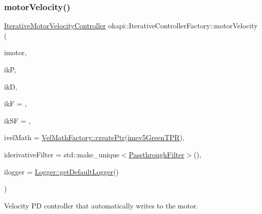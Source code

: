 \subsubsection{\texorpdfstring{motorVelocity()}{motorVelocity()}\hspace{0.1cm}{\footnotesize\ttfamily [2/4]}}
{\footnotesize\ttfamily \mbox{\hyperlink{classokapi_1_1IterativeMotorVelocityController}{Iterative\+Motor\+Velocity\+Controller}} okapi\+::\+Iterative\+Controller\+Factory\+::motor\+Velocity (\begin{DoxyParamCaption}\item[{\mbox{\hyperlink{classokapi_1_1MotorGroup}{Motor\+Group}}}]{imotor,  }\item[{double}]{ikP,  }\item[{double}]{ikD,  }\item[{double}]{ikF = {},  }\item[{double}]{ik\+SF = {},  }\item[{std\+::unique\+\_\+ptr$<$ \mbox{\hyperlink{classokapi_1_1VelMath}{Vel\+Math}} $>$}]{ivel\+Math = {\ttfamily \mbox{\hyperlink{classokapi_1_1VelMathFactory_a26b75e227e114812131c64d17015948f}{Vel\+Math\+Factory\+::create\+Ptr}}(\mbox{\hyperlink{namespaceokapi_a5263bab3bfecd482a573b6d04fb584ac}{imev5\+Green\+T\+PR}})},  }\item[{std\+::unique\+\_\+ptr$<$ \mbox{\hyperlink{classokapi_1_1Filter}{Filter}} $>$}]{iderivative\+Filter = {\ttfamily std\+:\+:make\+\_\+unique$<$\mbox{\hyperlink{classokapi_1_1PassthroughFilter}{Passthrough\+Filter}}$>$()},  }\item[{const std\+::shared\+\_\+ptr$<$ \mbox{\hyperlink{classokapi_1_1Logger}{Logger}} $>$ \&}]{ilogger = {\ttfamily \mbox{\hyperlink{classokapi_1_1Logger_a5053cf778b4b55acba788a3797dc96d2}{Logger\+::get\+Default\+Logger}}()} }\end{DoxyParamCaption})\hspace{0.3cm}{\ttfamily [static]}}

Velocity PD controller that automatically writes to the motor.


